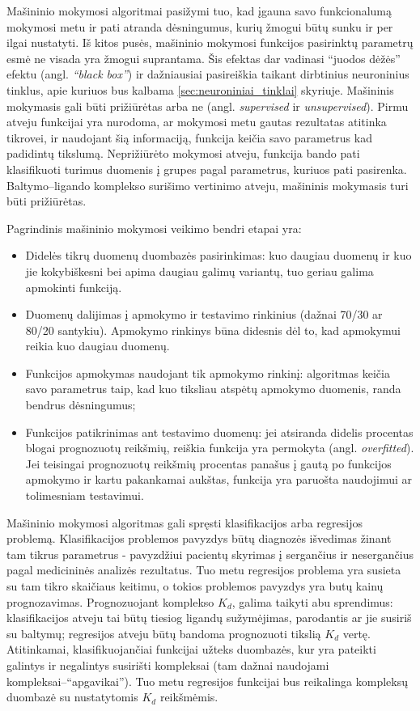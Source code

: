 Mašininio mokymosi algoritmai pasižymi tuo, kad įgauna savo funkcionalumą mokymosi metu ir pati atranda dėsningumus, kurių žmogui būtų sunku ir per ilgai nustatyti.\cite{stepniewska-dziubinska_development_2018} Iš kitos pusės, mašininio mokymosi funkcijos pasirinktų parametrų esmė ne visada yra žmogui suprantama. Šis efektas dar vadinasi \enquote{juodos dėžės} efektu (angl. \textit{\enquote{black box}}) ir dažniausiai pasireiškia taikant dirbtinius neuroninius tinklus,\cite{liu_classification_2015} apie kuriuos bus kalbama \ref{sec:neuroniniai_tinklai} skyriuje. Mašininis mokymasis gali būti prižiūrėtas arba ne (angl. \textit{supervised} ir \textit{unsupervised}). Pirmu atveju funkcijai yra nurodoma, ar mokymosi metu gautas rezultatas atitinka tikrovei, ir naudojant šią informaciją, funkcija keičia savo parametrus kad padidintų tikslumą. Neprižiūrėto mokymosi atveju, funkcija bando pati klasifikuoti turimus duomenis į grupes pagal parametrus, kuriuos pati pasirenka.\cite{schmidhuber_deep_2015} Baltymo--ligando komplekso surišimo vertinimo atveju, mašininis mokymasis turi būti prižiūrėtas.

Pagrindinis mašininio mokymosi veikimo bendri etapai yra:
\begin{itemize} 
\item Didelės tikrų duomenų duombazės pasirinkimas: kuo daugiau duomenų ir kuo jie kokybiškesni bei apima daugiau galimų variantų, tuo geriau galima apmokinti funkciją.\cite{stepniewska-dziubinska_development_2018}
\item Duomenų dalijimas į apmokymo ir testavimo rinkinius (dažnai 70/30 ar 80/20 santykiu). Apmokymo rinkinys būna didesnis dėl to, kad apmokymui reikia kuo daugiau duomenų.
\item Funkcijos apmokymas naudojant tik apmokymo rinkinį: algoritmas keičia savo parametrus taip, kad kuo tiksliau atspėtų apmokymo duomenis, randa bendrus dėsningumus;
\item Funkcijos patikrinimas ant testavimo duomenų: jei atsiranda didelis procentas blogai prognozuotų reikšmių, reiškia funkcija yra permokyta (angl. \textit{overfitted}). Jei teisingai prognozuotų reikšmių procentas panašus į gautą po funkcijos apmokymo ir kartu pakankamai aukštas, funkcija yra paruošta naudojimui ar tolimesniam testavimui.
\end{itemize}

Mašininio mokymosi algoritmas gali spręsti klasifikacijos arba regresijos problemą.\cite{lehr_playing_2017} Klasifikacijos problemos pavyzdys būtų diagnozės išvedimas žinant tam tikrus parametrus - pavyzdžiui pacientų skyrimas į sergančius ir nesergančius pagal medicininės analizės rezultatus. Tuo metu regresijos problema yra susieta su tam tikro skaičiaus keitimu, o tokios problemos pavyzdys yra butų kainų prognozavimas. Prognozuojant komplekso $K_{d}$, galima taikyti abu sprendimus: klasifikacijos atveju tai būtų tiesiog ligandų sužymėjimas, parodantis ar jie susiriš su baltymų; regresijos atveju būtų bandoma prognozuoti tikslią $K_{d}$ vertę. Atitinkamai, klasifikuojančiai funkcijai užteks duombazės, kur yra pateikti galintys ir negalintys susirišti kompleksai (tam dažnai naudojami kompleksai--\enquote{apgavikai}). Tuo metu regresijos funkcijai bus reikalinga kompleksų duombazė su nustatytomis $K_{d}$ reikšmėmis.

